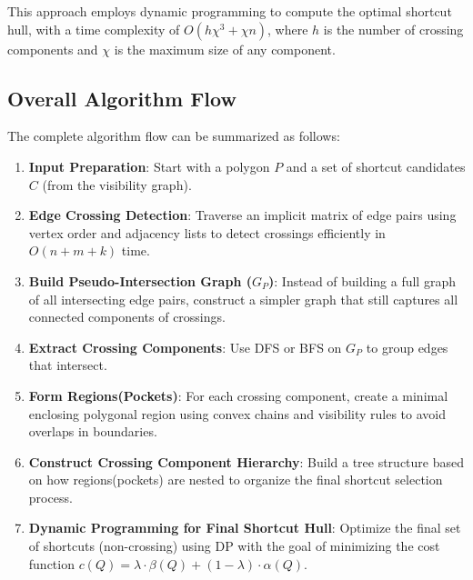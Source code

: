 \documentclass[11pt]{article}
\begin{document}
This approach employs dynamic programming to compute the optimal shortcut hull, with a time complexity of $O(h\chi^3 + \chi n)$, where $h$ is the number of crossing components and $\chi$ is the maximum size of any component.

\subsection{Overall Algorithm Flow}

The complete algorithm flow can be summarized as follows:

\begin{enumerate}

    \item \textbf{Input Preparation}: Start with a polygon $P$ and a set of shortcut candidates $C$ (from the visibility graph).
    
    \item \textbf{Edge Crossing Detection}: Traverse an implicit matrix of edge pairs using vertex order and adjacency lists to detect crossings efficiently in $O(n + m + k)$ time.
    
    \item \textbf{Build Pseudo-Intersection Graph ($G_P$)}: Instead of building a full graph of all intersecting edge pairs, construct a simpler graph that still captures all connected components of crossings.
    
    \item \textbf{Extract Crossing Components}: Use DFS or BFS on $G_P$ to group edges that intersect.
    
    \item \textbf{Form Regions(Pockets)}: For each crossing component, create a minimal enclosing polygonal region using convex chains and visibility rules to avoid overlaps in boundaries.
    
    \item \textbf{Construct Crossing Component Hierarchy}: Build a tree structure based on how regions(pockets) are nested to organize the final shortcut selection process.
    
    \item \textbf{Dynamic Programming for Final Shortcut Hull}: Optimize the final set of shortcuts (non-crossing) using DP with the goal of minimizing the cost function $c(Q) = \lambda \cdot \beta(Q) + (1 - \lambda) \cdot \alpha(Q)$.
\end{enumerate}
\end{document}
